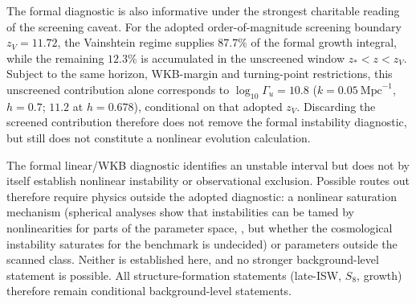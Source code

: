 The formal diagnostic is also informative under the strongest charitable reading of the screening caveat. For the adopted order-of-magnitude screening boundary $z_V=11.72$, the Vainshtein regime supplies $87.7\%$ of the formal growth integral, while the remaining $12.3\%$ is accumulated in the unscreened window $z_*<z<z_V$. Subject to the same horizon, WKB-margin and turning-point restrictions, this unscreened contribution alone corresponds to $\log_{10}\Gamma_u=10.8$ ($k=0.05\ \mathrm{Mpc}^{-1}$, $h=0.7$; $11.2$ at $h=0.678$), conditional on that adopted $z_V$. Discarding the screened contribution therefore does not remove the formal instability diagnostic, but still does not constitute a nonlinear evolution calculation.

The formal linear/WKB diagnostic identifies an unstable interval but does not by itself establish nonlinear instability or observational exclusion. Possible routes out therefore require physics outside the adopted diagnostic: a nonlinear saturation mechanism (spherical analyses show that instabilities can be tamed by nonlinearities for parts of the parameter space, \citealp{Aoki2015,Hogas2020stab}, but whether the cosmological instability saturates for the benchmark is undecided) or parameters outside the scanned class. Neither is established here, and no stronger background-level statement is possible. All structure-formation statements (late-ISW, $S_8$, growth) therefore remain conditional background-level statements.
